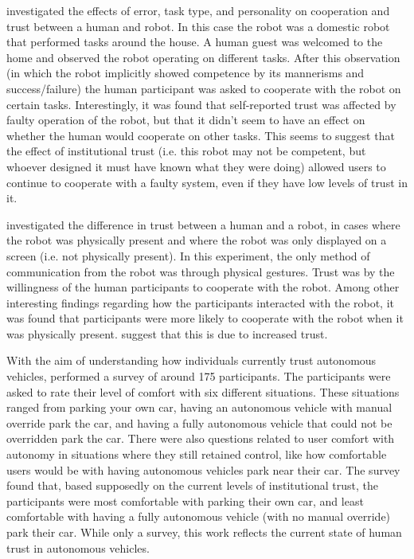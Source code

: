 \citet{Salem2015-md} investigated the effects of error, task type, and personality on cooperation and trust between a human and robot. In this case the robot was a domestic robot that performed tasks around the house. A human guest was welcomed to the home and observed the robot operating on different tasks. After this observation (in which the robot implicitly showed competence by its mannerisms and success/failure) the human participant was asked to cooperate with the robot on certain tasks. Interestingly, it was found that self-reported trust was affected by faulty operation of the robot, but that it didn't seem to have an effect on whether the human would cooperate on other tasks. This seems to suggest that the effect of institutional trust (i.e. this robot may not be competent, but whoever designed it must have known what they were doing) allowed users to continue to cooperate with a faulty system, even if they have low levels of trust in it.

\citet{Bainbridge2011-pl} investigated the difference in trust between a human and a robot, in cases where the robot was physically present and where the robot was only displayed on a screen (i.e. not physically present). In this experiment, the only method of communication from the robot was through physical gestures. Trust was by the willingness of the human participants to cooperate with the robot. Among other interesting findings regarding how the participants interacted with the robot, it was found that participants were more likely to cooperate with the robot when it was physically present. \citeauthor{Bainbridge2011-pl} suggest that this is due to increased trust.

With the aim of understanding how individuals currently trust autonomous vehicles, \citet{Munjal_Desai2009-en} performed a survey of around 175 participants. The participants were asked to rate their level of comfort with six different situations. These situations ranged from parking your own car, having an autonomous vehicle with manual override park the car, and having a fully autonomous vehicle that could not be overridden park the car. There were also questions related to user comfort with autonomy in situations where they still retained control, like how comfortable users would be with having autonomous vehicles park near their car. The survey found that, based supposedly on the current levels of institutional trust, the participants were most comfortable with parking their own car, and least comfortable with having a fully autonomous vehicle (with no manual override) park their car. While only a survey, this work reflects the current state of human trust in autonomous vehicles. 


